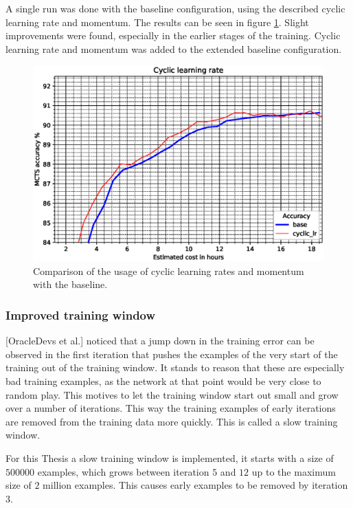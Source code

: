 \documentclass[12pt,onecolumn,oneside,titlepage]{article}
\begin{document}
A single run was done with the baseline configuration, using the described cyclic learning rate and momentum. The results can be seen in figure \ref{fig:cyclic_results}.
Slight improvements were found, especially in the earlier stages of the training. Cyclic learning rate and momentum was added to the extended baseline 
configuration. 


\begin{figure}[H]
\centering
\includegraphics[clip,width=\columnwidth]{cyclic_results}
\caption{Comparison of the usage of cyclic learning rates and momentum with the baseline.}
\label{fig:cyclic_results}
\end{figure}



\subsubsection{Improved training window}

\cite{oracledevs6}[OracleDevs et al.] noticed that a jump down in the training error can be observed in the first iteration that pushes the examples of the very start of the training out of the training window. It stands to 
reason that these are especially bad training examples, as the network at that point would be very close to random play. This motives to let the training window start out small and grow over a number of iterations. This way the 
training examples of early iterations are removed from the training data more quickly. This is called a slow training window.

For this Thesis a slow training window is implemented, it starts with a size of $500000$ examples, which grows between iteration $5$ and $12$ up to the maximum size of $2$ million examples. This causes early examples to be removed by iteration $3$.
\end{document}
